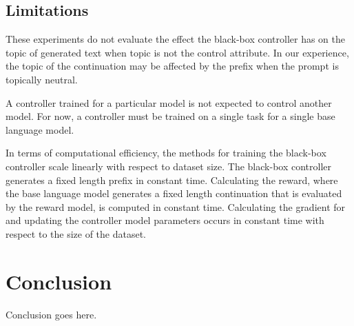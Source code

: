 \documentclass[phd,electronic,oneside,twosidetoc,letterpaper,chaptercenter,parttop,lof]{byumsphd}
\begin{document}
\section{Limitations}
\label{limitations}

These experiments do not evaluate the effect the black-box controller has on the topic of generated text when topic is not the control attribute.
In our experience, the topic of the continuation may be affected by the prefix when the prompt is topically neutral.

A controller trained for a particular model is not expected to control another model.
For now, a controller must be trained on a single task for a single base language model.

In terms of computational efficiency, the methods for training the black-box controller scale linearly with respect to dataset size.
The black-box controller generates a fixed length prefix in constant time.
Calculating the reward, where the base language model generates a fixed length continuation that is evaluated by the reward model, is computed in constant time.
Calculating the gradient for and updating the controller model parameters occurs in constant time with respect to the size of the dataset.

\chapter{Conclusion}
\label{chap:conclusion}

Conclusion goes here.



\end{document}
